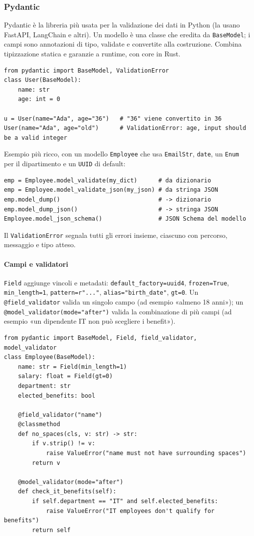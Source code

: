 \documentclass[a4paper,12pt]{article}
\begin{document}
\subsubsection{Pydantic}
Pydantic è la libreria più usata per la validazione dei dati in Python (la usano FastAPI,
LangChain e altri). Un modello è una classe che eredita da \texttt{BaseModel}; i campi sono
annotazioni di tipo, validate e convertite alla costruzione. Combina tipizzazione statica e
garanzie a runtime, con core in Rust.
\begin{verbatim}
from pydantic import BaseModel, ValidationError
class User(BaseModel):
    name: str
    age: int = 0

u = User(name="Ada", age="36")   # "36" viene convertito in 36
User(name="Ada", age="old")      # ValidationError: age, input should be a valid integer
\end{verbatim}
Esempio più ricco, con un modello \texttt{Employee} che usa \texttt{EmailStr}, \texttt{date}, un
\texttt{Enum} per il dipartimento e un \texttt{UUID} di default:
\begin{verbatim}
emp = Employee.model_validate(my_dict)      # da dizionario
emp = Employee.model_validate_json(my_json) # da stringa JSON
emp.model_dump()                            # -> dizionario
emp.model_dump_json()                       # -> stringa JSON
Employee.model_json_schema()                # JSON Schema del modello
\end{verbatim}
Il \texttt{ValidationError} segnala tutti gli errori insieme, ciascuno con percorso, messaggio
e tipo atteso.

\paragraph{Campi e validatori} \texttt{Field} aggiunge vincoli e metadati:
\texttt{default\_factory=uuid4}, \texttt{frozen=True}, \texttt{min\_length=1},
\texttt{pattern=r"..."}, \texttt{alias="birth\_date"}, \texttt{gt=0}. Un
\texttt{@field\_validator} valida un singolo campo (ad esempio «almeno 18 anni»); un
\texttt{@model\_validator(mode="after")} valida la combinazione di più campi (ad esempio «un
dipendente IT non può scegliere i benefit»).
\begin{verbatim}
from pydantic import BaseModel, Field, field_validator, model_validator
class Employee(BaseModel):
    name: str = Field(min_length=1)
    salary: float = Field(gt=0)
    department: str
    elected_benefits: bool

    @field_validator("name")
    @classmethod
    def no_spaces(cls, v: str) -> str:
        if v.strip() != v:
            raise ValueError("name must not have surrounding spaces")
        return v

    @model_validator(mode="after")
    def check_it_benefits(self):
        if self.department == "IT" and self.elected_benefits:
            raise ValueError("IT employees don't qualify for benefits")
        return self
\end{verbatim}
\end{document}
